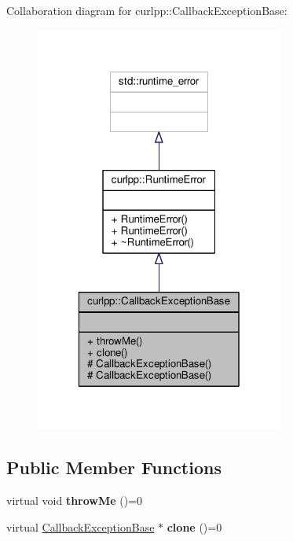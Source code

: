 Collaboration diagram for curlpp\-:\-:Callback\-Exception\-Base\-:
\nopagebreak
\begin{figure}[H]
\begin{center}
\leavevmode
\includegraphics[width=232pt]{classcurlpp_1_1CallbackExceptionBase__coll__graph}
\end{center}
\end{figure}
\subsection*{Public Member Functions}
\begin{DoxyCompactItemize}
\item 
\hypertarget{classcurlpp_1_1CallbackExceptionBase_a4fd828e9866ed8bc914051738c530d8f}{virtual void {\bfseries throw\-Me} ()=0}\label{classcurlpp_1_1CallbackExceptionBase_a4fd828e9866ed8bc914051738c530d8f}

\item 
\hypertarget{classcurlpp_1_1CallbackExceptionBase_a9bdb8d529c717cdb1055ab65b38a4912}{virtual \hyperlink{classcurlpp_1_1CallbackExceptionBase}{Callback\-Exception\-Base} $\ast$ {\bfseries clone} ()=0}\label{classcurlpp_1_1CallbackExceptionBase_a9bdb8d529c717cdb1055ab65b38a4912}

\end{DoxyCompactItemize}
